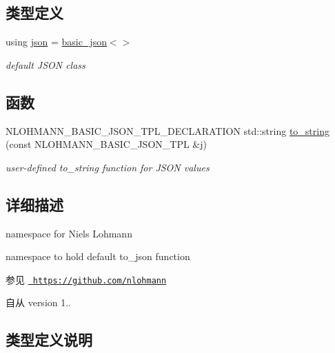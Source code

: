 \subsection*{类型定义}
\begin{DoxyCompactItemize}
\item 
using \mbox{\hyperlink{namespacenlohmann_a2bfd99e845a2e5cd90aeaf1b1431f474}{json}} = \mbox{\hyperlink{classnlohmann_1_1basic__json}{basic\+\_\+json}}$<$$>$
\begin{DoxyCompactList}\small\item\em default J\+S\+ON class \end{DoxyCompactList}\end{DoxyCompactItemize}
\subsection*{函数}
\begin{DoxyCompactItemize}
\item 
N\+L\+O\+H\+M\+A\+N\+N\+\_\+\+B\+A\+S\+I\+C\+\_\+\+J\+S\+O\+N\+\_\+\+T\+P\+L\+\_\+\+D\+E\+C\+L\+A\+R\+A\+T\+I\+ON std\+::string \mbox{\hyperlink{namespacenlohmann_a6ce645a0b8717757e096a5b5773b7a16}{to\+\_\+string}} (const N\+L\+O\+H\+M\+A\+N\+N\+\_\+\+B\+A\+S\+I\+C\+\_\+\+J\+S\+O\+N\+\_\+\+T\+PL \&j)
\begin{DoxyCompactList}\small\item\em user-\/defined to\+\_\+string function for J\+S\+ON values \end{DoxyCompactList}\end{DoxyCompactItemize}


\subsection{详细描述}
namespace for Niels Lohmann 

namespace to hold default {\ttfamily to\+\_\+json} function

\begin{DoxySeeAlso}{参见}
\href{https://github.com/nlohmann}{\texttt{ https\+://github.\+com/nlohmann}} 
\end{DoxySeeAlso}
\begin{DoxySince}{自从}
version 1.. 
\end{DoxySince}


\subsection{类型定义说明}
\mbox{\label{namespacenlohmann_a2bfd99e845a2e5cd90aeaf1b1431f474}} 
